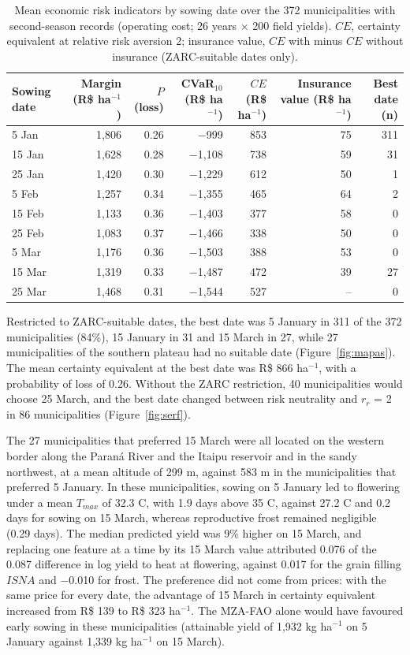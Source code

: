 \documentclass[10pt,a4paper]{article}
\begin{document}
\begin{table}[t]
\centering
\caption{Mean economic risk indicators by sowing date over the 372 municipalities with second-season
records (operating cost; 26 years $\times$ 200 field yields). $CE$, certainty equivalent at relative risk
aversion 2; insurance value, $CE$ with minus $CE$ without insurance (ZARC-suitable dates only).}
\label{tab:risk}
\small
\begin{tabular}{lrrrrrr}
\toprule
Sowing date & Margin (R\$ ha$^{-1}$) & $P$(loss) & CVaR$_{10}$ (R\$ ha$^{-1}$) & $CE$ (R\$ ha$^{-1}$) & Insurance value (R\$ ha$^{-1}$) & Best date (n) \\
\midrule
5 Jan  & 1,806 & 0.26 & $-$999   & 853 & 75 & 311 \\
15 Jan & 1,628 & 0.28 & $-$1,108 & 738 & 59 & 31 \\
25 Jan & 1,420 & 0.30 & $-$1,229 & 612 & 50 & 1 \\
5 Feb  & 1,257 & 0.34 & $-$1,355 & 465 & 64 & 2 \\
15 Feb & 1,133 & 0.36 & $-$1,403 & 377 & 58 & 0 \\
25 Feb & 1,083 & 0.37 & $-$1,466 & 338 & 50 & 0 \\
5 Mar  & 1,176 & 0.36 & $-$1,503 & 388 & 53 & 0 \\
15 Mar & 1,319 & 0.33 & $-$1,487 & 472 & 39 & 27 \\
25 Mar & 1,468 & 0.31 & $-$1,544 & 527 & -- & 0 \\
\bottomrule
\end{tabular}
\end{table}

Restricted to ZARC-suitable dates, the best date was 5 January in 311 of the 372 municipalities (84\%),
15 January in 31 and 15 March in 27, while 27 municipalities of the southern plateau had no suitable date
(Figure~\ref{fig:mapas}). The mean certainty equivalent at the best date was R\$ 866 ha$^{-1}$, with a
probability of loss of 0.26. Without the ZARC restriction, 40 municipalities would choose 25 March, and
the best date changed between risk neutrality and $r_r$ = 2 in 86 municipalities (Figure~\ref{fig:serf}).

The 27 municipalities that preferred 15 March were all located on the western border along the Paraná
River and the Itaipu reservoir and in the sandy northwest, at a mean altitude of 299 m, against 583 m in
the municipalities that preferred 5 January. In these municipalities, sowing on 5 January led to flowering
under a mean $T_{max}$ of 32.3 \textdegree{}C, with 1.9 days above 35 \textdegree{}C, against 27.2
\textdegree{}C and 0.2 days for sowing on 15 March, whereas reproductive frost remained negligible (0.29
days). The median predicted yield was 9\% higher on 15 March, and replacing one feature at a time by its
15 March value attributed 0.076 of the 0.087 difference in log yield to heat at flowering, against 0.017
for the grain filling $ISNA$ and $-$0.010 for frost. The preference did not come from prices: with the same
price for every date, the advantage of 15 March in certainty equivalent increased from R\$ 139 to
R\$ 323 ha$^{-1}$. The MZA-FAO alone would have favoured early sowing in these municipalities (attainable
yield of 1,932 kg ha$^{-1}$ on 5 January against 1,339 kg ha$^{-1}$ on 15 March).
\end{document}
